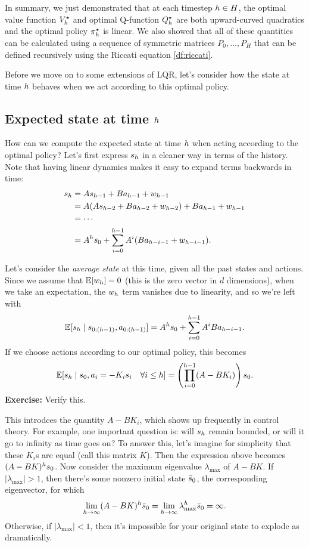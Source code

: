 \documentclass[\main/main]{subfiles}
\begin{document}
In summary, we just demonstrated that at each timestep $h \in H$, the optimal value function $V^\star_h$ and optimal Q-function $Q^\star_h$ are both upward-curved quadratics and the optimal policy $\pi^\star_h$ is linear.
We also showed that all of these quantities can be calculated using a sequence of symmetric matrices $P_0, \dots, P_H$ that can be defined recursively using the Riccati equation \eqref{df:riccati}.

Before we move on to some extensions of LQR, let's consider how the state at time $h$ behaves when we act according to this optimal policy.

\subsection{Expected state at time $h$}

How can we compute the expected state at time $h$ when acting according to the optimal policy?
Let's first express $s_h$ in a cleaner way in terms of the history. Note that having linear dynamics makes it easy to expand terms backwards in time:
\begin{align*}
    s_h & = A s_{h-1} + B a_{h-1} + w_{h-1}                                 \\
            & = A (As_{h-2} + B a_{h-2} + w_{h-2}) + B a_{h-1} + w_{h-1} \\
            & = \cdots                                                                     \\
            & = A^h s_0 + \sum_{i=0}^{h-1} A^i (B a_{h-i-1} + w_{h-i-1}).
\end{align*}

Let's consider the \emph{average state} at this time, given all the past states and actions.
Since we assume that $\operatorname*{\mathbb{E}} [w_h] = 0$ (this is the zero vector in $d$ dimensions),
when we take an expectation, the $w_h$ term vanishes due to linearity, and so we're left with \[
    \operatorname*{\mathbb{E}} [s_h \mid s_{0:(h-1)}, a_{0:(h-1)}] = A^h s_0 + \sum_{i=0}^{h-1} A^i B a_{h-i-1}.
\]
If we choose actions according to our optimal policy, this becomes \[
    \operatorname*{\mathbb{E}} [s_h \mid s_0, a_i = - K_i s_i \quad \forall i \le h] = \left( \prod_{i=0}^{h-1} (A - B K_i) \right) s_0.
\]
\textbf{Exercise:} Verify this.

This introdces the quantity $A - B K_i$, which shows up frequently in control theory.
For example, one important question is: will $s_h$ remain bounded,
or will it go to infinity as time goes on?
To answer this, let's imagine for simplicity that these $K_i$s are equal (call this matrix $K$).
Then the expression above becomes $(A-BK)^h s_0$.
Now consider the maximum eigenvalue $\lambda_{\max}$ of $A - BK$.
If $|\lambda_{\max}| > 1$, then there's some nonzero initial state $\bar {s}_0$, the corresponding eigenvector, for which \[
    \lim_{h \to \infty} (A - BK)^h \bar {s}_0
    = \lim_{h \to \infty} \lambda_{\max}^h \bar {s}_0
    = \infty.
\]
Otherwise, if $|\lambda_{\max}| < 1$, then it's impossible for your original state to explode as dramatically.
\end{document}
